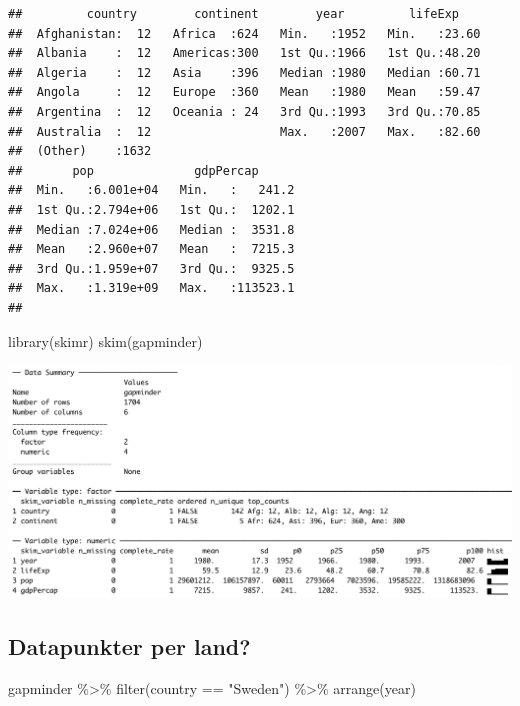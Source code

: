 \documentclass[
]{book}
\newenvironment{Shaded}{\begin{snugshade}}{\end{snugshade}}
\newcommand{\FunctionTok}[1]{\textcolor[rgb]{0.00,0.00,0.00}{#1}}
\newcommand{\NormalTok}[1]{#1}
\newcommand{\SpecialCharTok}[1]{\textcolor[rgb]{0.00,0.00,0.00}{#1}}
\newcommand{\StringTok}[1]{\textcolor[rgb]{0.31,0.60,0.02}{#1}}
\begin{document}
\begin{verbatim}
##         country        continent        year         lifeExp     
##  Afghanistan:  12   Africa  :624   Min.   :1952   Min.   :23.60  
##  Albania    :  12   Americas:300   1st Qu.:1966   1st Qu.:48.20  
##  Algeria    :  12   Asia    :396   Median :1980   Median :60.71  
##  Angola     :  12   Europe  :360   Mean   :1980   Mean   :59.47  
##  Argentina  :  12   Oceania : 24   3rd Qu.:1993   3rd Qu.:70.85  
##  Australia  :  12                  Max.   :2007   Max.   :82.60  
##  (Other)    :1632                                                
##       pop              gdpPercap       
##  Min.   :6.001e+04   Min.   :   241.2  
##  1st Qu.:2.794e+06   1st Qu.:  1202.1  
##  Median :7.024e+06   Median :  3531.8  
##  Mean   :2.960e+07   Mean   :  7215.3  
##  3rd Qu.:1.959e+07   3rd Qu.:  9325.5  
##  Max.   :1.319e+09   Max.   :113523.1  
## 
\end{verbatim}

\begin{Shaded}
\begin{Highlighting}[]
\FunctionTok{library}\NormalTok{(skimr)}
\FunctionTok{skim}\NormalTok{(gapminder)}
\end{Highlighting}
\end{Shaded}

\includegraphics{images/gapminder_skim.png}

\hypertarget{datapunkter-per-land}{%
\subsection{Datapunkter per land?}\label{datapunkter-per-land}}

\begin{Shaded}
\begin{Highlighting}[]
\NormalTok{gapminder }\SpecialCharTok{\%\textgreater{}\%} \FunctionTok{filter}\NormalTok{(country }\SpecialCharTok{==} \StringTok{"Sweden"}\NormalTok{) }\SpecialCharTok{\%\textgreater{}\%} \FunctionTok{arrange}\NormalTok{(year)}
\end{Highlighting}
\end{Shaded}
\end{document}
